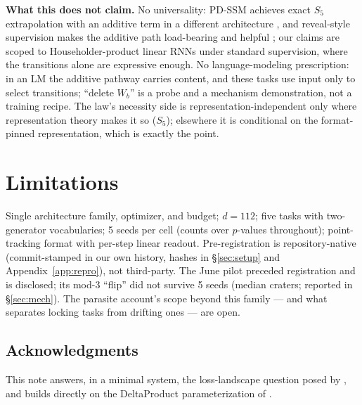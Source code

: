 \documentclass[10pt]{article}
\begin{document}
\textbf{What this does not claim.} No universality: PD-SSM achieves exact $S_5$ extrapolation with an
additive term in a different architecture \citep{terzic2025pdssm}, and reveal-style supervision
makes the additive path load-bearing and helpful \citep{siems2026codestate}; our claims are scoped to
Householder-product linear RNNs under standard supervision, where the transitions alone are
expressive enough. No language-modeling prescription: in an LM the additive pathway carries content,
and these tasks use input only to select transitions; ``delete $W_b$'' is a probe and a mechanism
demonstration, not a training recipe. The law's necessity side is representation-independent only
where representation theory makes it so ($S_5$); elsewhere it is conditional on the format-pinned
representation, which is exactly the point.

\section{Limitations}
Single architecture family, optimizer, and budget; $d{=}112$; five tasks with two-generator
vocabularies; 5 seeds per cell (counts over $p$-values throughout); point-tracking format with
per-step linear readout. Pre-registration is repository-native (commit-stamped in our own history,
hashes in \S\ref{sec:setup} and Appendix~\ref{app:repro}), not third-party. The June pilot preceded
registration and is disclosed; its mod-3 ``flip'' did not survive 5 seeds (median craters; reported in
\S\ref{sec:mech}). The parasite account's scope beyond this family --- and what separates locking
tasks from drifting ones --- are open.

\subsection*{Acknowledgments}
This note answers, in a minimal system, the loss-landscape question posed by
\citet{shakerinava2026diagonal}, and builds directly on the DeltaProduct parameterization of
\citet{siems2025deltaproduct}.




\appendix
\end{document}
